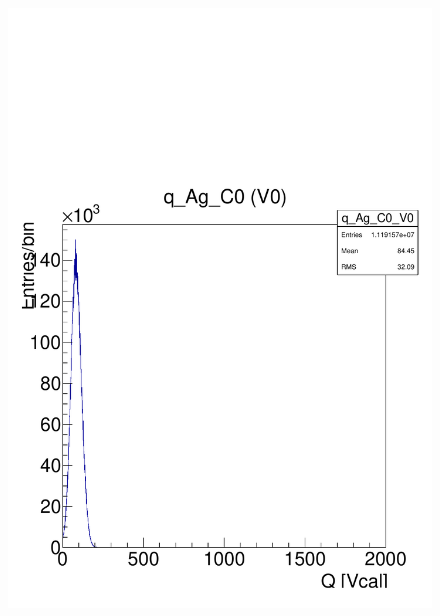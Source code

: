 \documentclass[a4paper,12pt,twoside]{article}
\begin{document}
\begin{figure} [h!]
\begin{minipage}{.48\textwidth}
  \includegraphics[width=\textwidth]{./HRData_q_histo.pdf}
  \label{HRData-Qhisto}
\end{minipage}
\end{figure}
\end{document}
